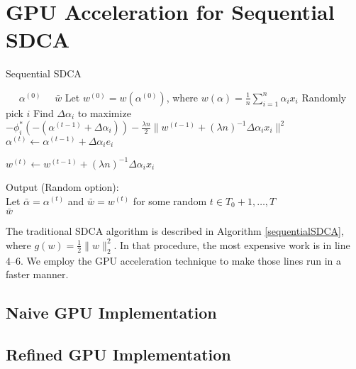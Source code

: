 \documentclass{article}
\begin{document}
\section{GPU Acceleration for Sequential SDCA}
\begin{algorithm}[H]
	\caption{Sequential SDCA}
	\label{sequentialSDCA}
	\begin{algorithmic}[1]
	\REQUIRE~~ $\alpha^{(0)}$
		\ENSURE~~$\bar{w}$
		\STATE Let $w^{(0)}=w(\alpha^{(0)})$, where $w(\alpha)=\frac{1}{n}\sum_{i=1}^{n}\alpha_ix_i$
		\STATE Randomly pick $i$
		\STATE Find $\Delta\alpha_i$ to maximize $-\phi_i^*(-(\alpha^{(t-1)}+\Delta\alpha_i))-\frac{\lambda n}{2}\|w^{(t-1)}+(\lambda n)^{-1}\Delta \alpha_i x_i\|^2$
		\STATE $\alpha^{(t)}\leftarrow\alpha^{(t-1)}+\Delta\alpha_ie_i$
		
		\STATE $w^{(t)}\leftarrow w^{(t-1)}+(\lambda n)^{-1}\Delta\alpha_i x_i$
		\ENDFOR
		
		\STATE Output (Random option):\\
		Let $\bar{\alpha}=\alpha^{(t)}$ and $\bar{w}=w^{(t)}$ for some random $t\in T_0+1,\ldots,T$\\
		\RETURN $\bar{w}$
		
	\end{algorithmic}
\end{algorithm}
The traditional SDCA algorithm \cite{shalev2013stochastic} is described in Algorithm \ref{sequentialSDCA}, where $g(w)=\frac{1}{2}\|w\|_2^2$.
In that procedure, the most expensive work is in line 4--6. We employ the GPU acceleration technique to make those lines run in a faster manner.
\subsection{Naive GPU Implementation}
\subsection{Refined GPU Implementation}
\end{document}
